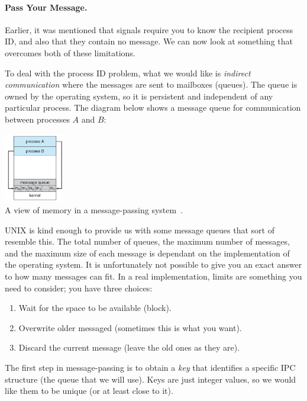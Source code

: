 \paragraph{Pass Your Message.} Earlier, it was mentioned that signals require you to know the recipient process ID, and also that they contain no message. We can now look at something that overcomes both of these limitations. 

To deal with the process ID problem, what we would like is \textit{indirect communication} where the messages are sent to mailboxes (queues). The queue is owned by the operating system, so it is persistent and independent of any particular process. The diagram below shows a message queue for communication between processes $A$ and $B$:
\begin{center}
	\includegraphics[width=0.2\textwidth]{images/message-passing.png}\\
	A view of memory in a message-passing system~\cite{osc}.
\end{center}

UNIX is kind enough to provide us with some message queues that sort of resemble this. The total number of queues, the maximum number of messages, and the maximum size of each message is dependant on the implementation of the operating system. It is unfortunately not possible to give you an exact answer to how many messages can fit. In a real implementation, limits are something you need to consider; you have three choices:

\begin{enumerate}
       \item Wait for the space to be available (block).
       \item Overwrite older messaged (sometimes this is what you want).
       \item Discard the current message (leave the old ones as they are).
\end{enumerate}

The first step in message-passing is to obtain a \textit{key} that identifies a specific IPC structure (the queue that we will use). Keys are just integer values, so we would like them to be unique (or at least close to it).

